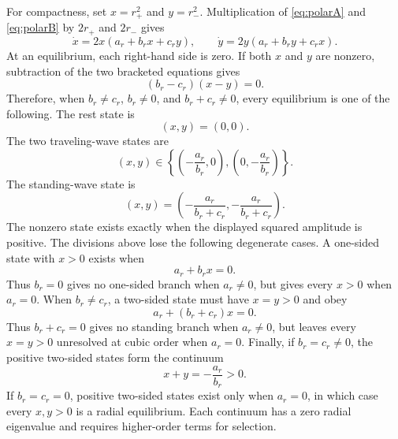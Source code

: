 \documentclass[11pt]{article}
\begin{document}
For compactness, set $x=r_+^2$ and $y=r_-^2$.  Multiplication of
\eqref{eq:polarA} and \eqref{eq:polarB} by $2r_+$ and $2r_-$ gives
\begin{equation}
 \dot x=2x(a_r+b_rx+c_ry),\qquad
 \dot y=2y(a_r+b_ry+c_rx).
 \label{eq:squared}
\end{equation}
At an equilibrium, each right-hand side is zero.  If both $x$ and $y$ are
nonzero, subtraction of the two bracketed equations gives
\begin{equation}
 (b_r-c_r)(x-y)=0.
\end{equation}
Therefore, when $b_r\ne c_r$, $b_r\ne0$, and $b_r+c_r\ne0$, every
equilibrium is one of the following.
The rest state is
\begin{equation}
 (x,y)=(0,0).
 \label{eq:rest}
\end{equation}
The two traveling-wave states are
\begin{equation}
 (x,y)\in
 \left\{\left(-\frac{a_r}{b_r},0\right),
           \left(0,-\frac{a_r}{b_r}\right)\right\}.
 \label{eq:tw}
\end{equation}
The standing-wave state is
\begin{equation}
 (x,y)=\left(-\frac{a_r}{b_r+c_r},
             -\frac{a_r}{b_r+c_r}\right).
 \label{eq:sw}
\end{equation}
The nonzero state exists exactly when the displayed squared amplitude is
positive.  The divisions above lose the following degenerate cases.  A
one-sided state with $x>0$ exists when
\begin{equation}
 a_r+b_rx=0.
 \label{eq:unforced-one-sided-undivided}
\end{equation}
Thus $b_r=0$ gives no one-sided branch when $a_r\ne0$, but gives every
$x>0$ when $a_r=0$.  When $b_r\ne c_r$, a two-sided state must have $x=y>0$
and obey
\begin{equation}
 a_r+(b_r+c_r)x=0.
 \label{eq:unforced-standing-undivided}
\end{equation}
Thus $b_r+c_r=0$ gives no standing branch when $a_r\ne0$, but leaves every
$x=y>0$ unresolved at cubic order when $a_r=0$.  Finally, if $b_r=c_r\ne0$,
the positive two-sided states form the continuum
\begin{equation}
 x+y=-\frac{a_r}{b_r}>0.
 \label{eq:unforced-degenerate-circle}
\end{equation}
If $b_r=c_r=0$, positive two-sided states exist only when $a_r=0$, in which
case every $x,y>0$ is a radial equilibrium.  Each continuum has a zero
radial eigenvalue and requires higher-order terms for selection.
\end{document}
